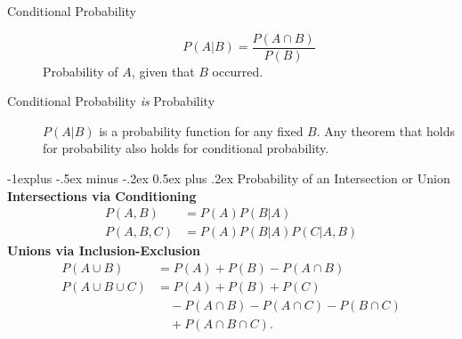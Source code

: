 \documentclass[10pt,landscape]{article}
\makeatletter
\renewcommand{\subsection}{\@startsection{subsection}{2}{0mm}%
                                {-1explus -.5ex minus -.2ex}%
                                {0.5ex plus .2ex}%
                                {\normalfont\normalsize\bfseries}}
\makeatother
\begin{document}
\begin{multicols*}{3}
    \begin{description}
        \item[Conditional Probability]
$$P({A}|{B}) = \frac{P(A\cap B)}{P(B)}$$
Probability of ${A}$, given that ${B}$ occurred.
        \item[Conditional Probability \emph{is} Probability]  $P({A}|{ B})$ is a probability function for any fixed $B$. Any theorem that holds for probability also holds for conditional probability.
    \end{description}

\subsection{Probability of an Intersection or Union}
\textbf{Intersections via Conditioning}
\begin{align*}
    P(A,B) &= P(A)P(B|A) \\
   P(A,B,C) &= P(A)P(B|A)P(C|A,B)
   \end{align*}
   \textbf{Unions via Inclusion-Exclusion}
   \begin{align*}
    P(A \cup B) &= P(A) + P(B) - P(A \cap B) \\
  P(A \cup B \cup C) &= P(A) + P(B) + P(C) \\
&\quad - P(A \cap B) - P(A \cap C) - P(B \cap C) \\
&\quad + P(A \cap B \cap C).
   \end{align*}



\end{multicols*}
\end{document}
